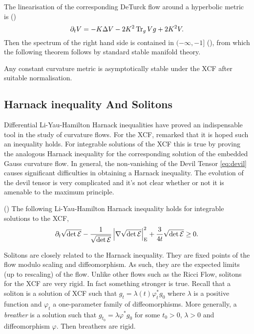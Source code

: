 \documentclass[a4paper,12pt]{amsart}
\begin{document}
The linearisation of the corresponding DeTurck flow around a hyperbolic metric is (\cite[Lemma 2]{MR2448593})
\[
\partial_t V = -K \Delta V -2K^2 \operatorname{Tr}_g V g + 2K^2 V.
\]
Then the spectrum of the right hand side is contained in \((-\infty, -1]\) (\cite[Section 5]{MR2448593}), from which the following theorem follows by standard stable manifold theory.

\begin{thm}[{\cite[Theorem 4]{MR2448593}}]
\label{thm:hyperbolic_stability}

Any constant curvature metric is asymptotically stable under the XCF after suitable normalisation.
\end{thm}

\subsection{Harnack inequality And Solitons}
\label{subsec:xcf_harnack_solitons}

Differential Li-Yau-Hamilton Harnack inequalities have proved an indispensable tool in the study of curvature flows. For the XCF, \cite[p. 9]{MR2055396} remarked that it is hoped such an inequality holds. For integrable solutions of the XCF this is true by proving the analogous Harnack inequality for the corresponding solution of the embedded Gauss curvature flow. In general, the non-vanishing of the Devil Tensor \eqref{eq:devil} causes significant difficulties in obtaining a Harnack inequality. The evolution of the devil tensor is very complicated and it's not clear whether or not it is amenable to the  maximum principle.

\begin{thm}(\cite[Section 6]{BIS4})
\label{thm:harnack}
The following Li-Yau-Hamilton Harnack inequality holds for integrable solutions to the XCF,
\[
\partial_t \sqrt{\det\operatorname{\mathcal{E}}} - \frac{1}{\sqrt{\det\operatorname{\mathcal{E}}}} \left\lvert{\nabla \sqrt{\det\operatorname{\mathcal{E}}}}\right\rvert_{\operatorname{E}}^2 + \frac{3}{4t}\sqrt{\det\operatorname{\mathcal{E}}} \geq 0.
\]
\end{thm}

Solitons are closely related to the Harnack inequality. They are fixed points of the flow modulo scaling and diffeomorphism. As such, they are the expected limits (up to rescaling) of the flow. Unlike other flows such as the Ricci Flow, solitons for the XCF are very rigid. In fact something stronger is true. Recall that a soliton is a solution of XCF such that \(g_t = \lambda(t) \varphi_t^{\ast} g_0\) where \(\lambda\) is a positive function and \(\varphi_t\) a one-parameter family of diffeomorphisms. More generally, a \emph{breather} is a solution such that \(g_{t_0} = \lambda \varphi^{\ast} g_0\) for some \(t_0 > 0\), \(\lambda > 0\) and diffeomorphism \(\varphi\). Then breathers are rigid.
\end{document}
